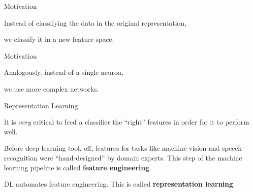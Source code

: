 \documentclass[11pt,compress,t,notes=noshow, xcolor=table]{beamer}
\begin{document}
\begin{framei}{Motivation}
\item Instead of classifying the data in the original representation,
\item we classify it in a new feature space.
\end{framei}

\begin{framei}{Motivation}
\item Analogously, instead of a single neuron, 
\item we use more complex networks.
\end{framei}

\begin{framei}{Representation Learning}
    \item It is %
    \textit{very} critical to feed a classifier the \enquote{right} features in order for it to perform well.
    \item Before deep learning took off, features for tasks like machine vision and speech recognition were \enquote{hand-designed} by domain experts. This step of the machine learning pipeline is called \textbf{feature engineering}.
    \item %
     DL %
    automates feature engineering. This is called \textbf{representation learning}.
\end{framei}
\end{document}
